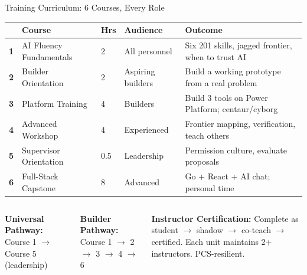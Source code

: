 \documentclass[aspectratio=169,11pt]{beamer}
\newcommand{\hl}[1]{\textbf{\color{scarlet}#1}}
\newcommand{\navy}[1]{\textbf{\color{navyblue}#1}}
\begin{document}
\begin{frame}[shrink=5]{Training Curriculum: 6 Courses, Every Role}

\renewcommand{\arraystretch}{1.15}
{\small
\begin{tabular}{@{}p{0.3cm}>{\raggedright\arraybackslash}p{3.8cm}p{1cm}p{2cm}p{5.5cm}@{}}
\toprule
& \textbf{Course} & \textbf{Hrs} & \textbf{Audience} & \textbf{Outcome} \\
\midrule
\hl{1} & AI Fluency Fundamentals & 2 & All personnel & Six 201 skills, jagged frontier, when to trust AI \\
\hl{2} & Builder Orientation & 2 & Aspiring builders & Build a working prototype from a real problem \\
\hl{3} & Platform Training & 4 & Builders & Build 3 tools on Power Platform; centaur/cyborg \\
\hl{4} & Advanced Workshop & 4 & Experienced & Frontier mapping, verification, teach others \\
\hl{5} & Supervisor Orientation & 0.5 & Leadership & Permission culture, evaluate proposals \\
\hl{6} & Full-Stack Capstone & 8 & Advanced & Go + React + AI chat; personal time \\
\bottomrule
\end{tabular}
}

\vspace{8pt}

\begin{columns}[T]
\navy{Universal Pathway:} Course 1 $\to$ Course 5 (leadership)

\navy{Builder Pathway:} Course 1 $\to$ 2 $\to$ 3 $\to$ 4 $\to$ 6

\navy{Instructor Certification:} Complete as student $\to$ shadow $\to$ co-teach $\to$ certified. Each unit maintains 2+ instructors. PCS-resilient.
\end{columns}

\end{frame}
\end{document}
